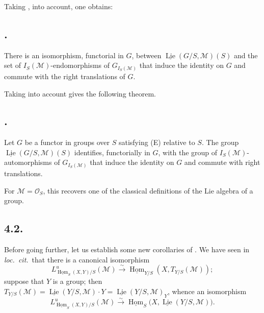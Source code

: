 Taking , into account, one obtains:

\subsection*{.}
There is an isomorphism, functorial in \(G\), between
\(\underline{\operatorname{Lie}}(G/S,\mathcal M)(S)\) and the set of
\(I_S(\mathcal M)\)-endomorphisms of \(G_{I_S(\mathcal M)}\) that
induce the identity on \(G\) and commute with the right translations of
\(G\).

Taking  into account gives the following theorem.

\subsection*{.}
Let \(G\) be a functor in groups over \(S\) satisfying (E) relative to
\(S\). The group \(\underline{\operatorname{Lie}}(G/S,\mathcal M)(S)\)
identifies, functorially in \(G\), with the group of
\(I_S(\mathcal M)\)-automorphisms of \(G_{I_S(\mathcal M)}\) that
induce the identity on \(G\) and commute with right translations.

For \(\mathcal M=\mathcal O_S\), this recovers one of the classical
definitions of the Lie algebra of a group.

\subsection*{4.2.}
Before going further, let us establish some new corollaries of
. We have seen in \emph{loc.\ cit.}\ that there is a canonical
isomorphism
\[
 L^u_{\underline{\operatorname{Hom}}_S(X,Y)/S}(\mathcal M)
 \xrightarrow{\sim}
 \underline{\operatorname{Hom}}_{Y/S}(X,T_{Y/S}(\mathcal M));
\]
suppose that \(Y\) is a group; then
\(T_{Y/S}(\mathcal M)=\underline{\operatorname{Lie}}(Y/S,\mathcal M)\cdot Y
=\underline{\operatorname{Lie}}(Y/S,\mathcal M)_Y\), whence an isomorphism
\[
 L^u_{\underline{\operatorname{Hom}}_S(X,Y)/S}(\mathcal M)
 \xrightarrow{\sim}
 \underline{\operatorname{Hom}}_S
   \bigl(X,\underline{\operatorname{Lie}}(Y/S,\mathcal M)\bigr).
\]

